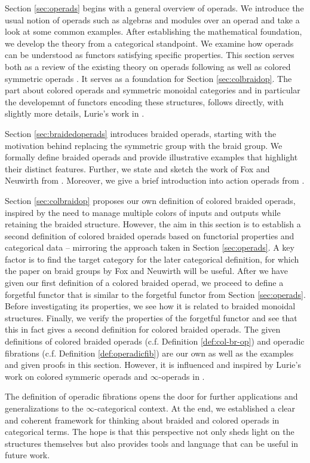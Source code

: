 Section \ref{sec:operads} begins with a general overview of operads. We
introduce the usual notion of operads such as algebras and modules over an
operad and take a look at some common examples. After establishing the mathematical
foundation, we develop the theory from a categorical standpoint. We examine how
operads can be understood as functors satisfying specific properties. This
section serves both as a review of the existing theory on operads following
\cite{may} as well as colored symmetric operads \cite{ha}. It serves as a foundation for
Section \ref{sec:colbraidop}. The part about colored operads and
symmetric monoidal categories and in particular the developemnt of functors
encoding these structures, follows directly, with slightly more details, 
Lurie's work in \cite[Section 2.1]{ha}.


\medskip
Section \ref{sec:braidedoperads} introduces braided operads, starting with the
motivation behind replacing the symmetric group with the braid group. We
formally define braided operads and provide illustrative examples that highlight
their distinct features. Further, we state and sketch the work of Fox and Neuwirth from
\cite{fox}. Moreover, we give a brief introduction into action operads from \cite{yau}.


\medskip
Section \ref{sec:colbraidop} proposes our own definition of colored braided
operads, inspired by the need to manage multiple colors of inputs and outputs
while retaining the braided structure. However, the aim in this section is to
establish a second definition of colored braided operads based on functorial properties and categorical data
-- mirroring the approach taken in Section \ref{sec:operads}. A key factor is to
find the target category for the later categorical definition, for which the
paper on braid groups by Fox and Neuwirth \cite{fox} will be useful. After we
have given our first definition of a colored braided operad, we proceed to
define a forgetful functor that is similar to the forgetful functor from Section
\ref{sec:operads}. Before investigating its properties, we see how it is related
to braided monoidal structures. Finally, we verify the properties of the
forgetful functor and see that this in fact gives a second definition for
colored braided operads. The given definitions of colored braided operads (c.f. Definition
\ref{def:col-br-op}) and operadic fibrations (c.f. Definition \ref{def:operadicfib}) are our own as
well as the examples and given proofs in this section. However, it is influenced
and inspired by Lurie's work on colored symmeric operads and $\infty$-operads in
\cite{ha}.

\medskip
The definition of operadic fibrations opens the door for further applications and generalizations to the
$\infty$-categorical context. At the end, we established a clear and
coherent framework for thinking about braided and colored operads in categorical
terms. The hope is that this perspective not only sheds light on the structures
themselves but also provides tools and language that can be useful in future
work.
